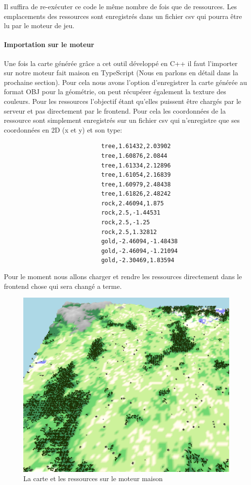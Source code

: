 Il suffira de re-exécuter ce code le même nombre de fois que de ressources. Les emplacements des ressources sont enregistrés dans un fichier csv qui pourra être lu par le moteur de jeu.


\paragraph{Importation sur le moteur}
Une fois la carte générée grâce a cet outil développé en C++ il faut l'importer sur notre moteur fait maison en TypeScript (Nous en parlons en détail dans la prochaine section). Pour cela nous avons l'option d'enregistrer la carte générée au format OBJ pour la géométrie, on peut récupérer également la texture des couleurs.
Pour les ressources l'objectif étant qu'elles puissent être chargés par le serveur et pas directement par le frontend. Pour cela les coordonnées de la ressource sont simplement enregistrés sur un fichier csv qui n'enregistre que ses coordonnées en 2D (x et y) et son type:

 \begin{center}
         \begin{verbatim}
                            tree,1.61432,2.03902
                            tree,1.60876,2.0844
                            tree,1.61334,2.12896
                            tree,1.61054,2.16839
                            tree,1.60979,2.48438
                            tree,1.61826,2.48242
                            rock,2.46094,1.875
                            rock,2.5,-1.44531
                            rock,2.5,-1.25
                            rock,2.5,1.32812
                            gold,-2.46094,-1.48438
                            gold,-2.46094,-1.21094
                            gold,-2.30469,1.83594
         \end{verbatim}
 \end{center}

Pour le moment nous allons charger et rendre les ressources directement dans le frontend chose qui sera changé a terme.

\begin{figure}[!h]
    \centering
    \includegraphics[width=0.4\linewidth]{images/generation_on_engine.png}
    \caption{La carte et les ressources sur le moteur maison}
    \label{fig:enter-label}
\end{figure}